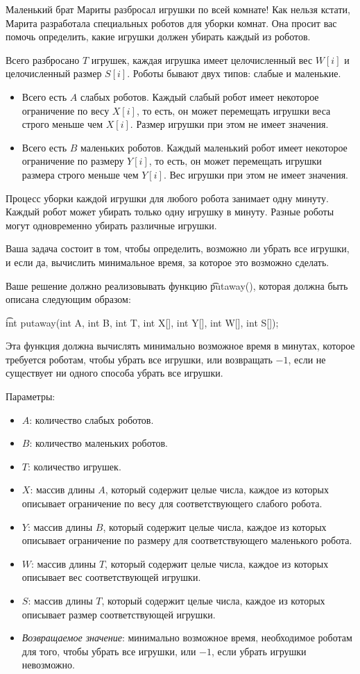Маленький брат Мариты разбросал игрушки по всей комнате! Как нельзя кстати, Марита разработала специальных роботов для уборки комнат. Она просит вас помочь определить, какие игрушки должен убирать каждый из роботов.

Всего разбросано $T$ игрушек, каждая игрушка имеет целочисленный вес $W[i]$ и целочисленный размер $S[i]$. Роботы бывают двух типов: слабые и маленькие.
\begin{itemize}
\item Всего есть $A$ слабых роботов. Каждый слабый робот имеет некоторое ограничение по весу $X[i]$, то есть, он может перемещать игрушки веса строго меньше чем $X[i]$. Размер игрушки при этом не имеет значения.
\item Всего есть $B$ маленьких роботов. Каждый маленький робот имеет некоторое ограничение по размеру $Y[i]$, то есть, он может перемещать игрушки размера строго меньше чем $Y[i]$. Вес игрушки при этом не имеет значения.
\end{itemize}

Процесс уборки каждой игрушки для любого робота занимает одну минуту. Каждый робот может убирать только одну игрушку в минуту. Разные роботы могут одновременно убирать различные игрушки.

Ваша задача состоит в том, чтобы определить, возможно ли убрать все игрушки, и если да, вычислить минимальное время, за которое это возможно сделать.

Ваше решение должно реализовывать функцию \t{putaway()}, которая должна быть описана следующим образом:

\t{int putaway(int A, int B, int T, int X[], int Y[], int W[], int S[]);}

Эта функция должна вычислять минимально возможное время в минутах, которое требуется роботам, чтобы убрать все игрушки, или возвращать $-1$, если не существует ни одного способа убрать все игрушки.

Параметры:
\begin{itemize}
\item $A$: количество слабых роботов.
\item $B$: количество маленьких роботов.
\item $T$: количество игрушек.
\item $X$: массив длины $A$, который содержит целые числа, каждое из которых описывает ограничение по весу для соответствующего слабого робота.
\item $Y$: массив длины $B$, который содержит целые числа, каждое из которых описывает ограничение по размеру для соответствующего маленького робота.
\item $W$: массив длины $T$, который содержит целые числа, каждое из которых описывает вес соответствующей игрушки.
\item $S$: массив длины $T$, который содержит целые числа, каждое из которых описывает размер соответствующей игрушки.
\item \textit{Возвращаемое значение}: минимально возможное время, необходимое роботам для того, чтобы убрать все игрушки, или ­$-1$, если убрать игрушки невозможно.
\end{itemize}
